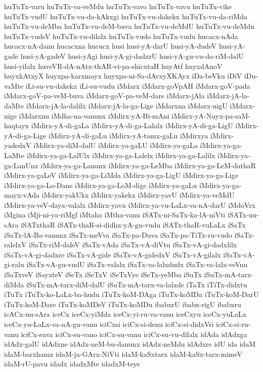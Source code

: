 {huTuTx-varu
huTuTx-va-veMdu
huTuTx-vavo
huTuTx-vavu
huTuTx-vike
huTuTx-vudU
huTuTx-vu-da-kAkxgi
huTuTx-vu-dakekx
huTuTx-vu-da-riMda
huTuTx-vu-deMba
huTuTx-vu-deM-buva
huTuTx-vu-deMdU
huTuTx-vu-deMdu
huTuTx-vudeV
huTuTx-vu-dilalx
huTuTx-vudo
huTuTx-vudu
hucacx-nAda
hucacx-nA-danu
hucacxna
hucucx
husi
husi-yA-darU
husi-yA-dudeV
husi-yA-gade
husi-yA-gadeV
husi-yAgi
husi-yA-gi-dadxrU
husi-yA-gu-vu-da-riM-dalU
husi-yilalx
huveVR-dA-nAtx-thAR-vi-pa-shicxtaH
huyAtf
huyxdAnoV
huyxkAtxyX
huyxpa-karxmayx
huyxpa-ni-Sa-dAvxyXKAyx
iDa-beVku
iDiV
iDu-vaMte
iLi-su-vu-dakekx
iLi-su-vudu
iMdarx
iMdarx-goVpAH
iMdarx-goV-pada
iMdarx-goV-pa-veM-buva
iMdarx-goV-pa-veM-dare
iMdarx-jAla
iMdarx-jA-la-daMte
iMdarx-jA-la-dalilx
iMdarx-jA-la-ga-Lige
iMdarxna
iMdarx-nigU
iMdarx-nige
iMdarxnu
iMdha-na-vanunx
iMdirx-yA-Bi-mAni
iMdirx-yA-Nuyx-pa-saM-haqtayx
iMdirx-yA-di-gaLa
iMdirx-yA-di-ga-Lalalx
iMdirx-yA-di-ga-LigU
iMdirx-yA-di-ga-Lige
iMdirx-yA-di-gaLu
iMdirx-yA-tamx-gaLu
iMdirxya
iMdirx-yadedxV
iMdirx-ya-diM-dalU
iMdirx-ya-gaLU
iMdirx-ya-gaLa
iMdirx-ya-ga-LaMte
iMdirx-ya-ga-LalUlx
iMdirx-ya-ga-Lalelx
iMdirx-ya-ga-Lalilx
iMdirx-ya-ga-LanUnx
iMdirx-ya-ga-Lanunx
iMdirx-ya-ga-LeMba
iMdirx-ya-ga-LeM-dathaR
iMdirx-ya-gaLeV
iMdirx-ya-ga-LiMda
iMdirx-ya-ga-LigU
iMdirx-ya-ga-Lige
iMdirx-ya-ga-Lo-Dane
iMdirx-ya-ga-LoM-dige
iMdirx-ya-gaLu
iMdirx-ya-ga-mayx-vAda
iMdirx-yakUkx
iMdirx-yakekx
iMdirx-yavU
iMdirx-ya-veMdU
iMdirx-ya-veV-dayx-valalx
iMdirx-yavu
iMdirx-ya-vu-LaLx-va-nA-darU
iMdoVrx
iMgina
iMji-ni-ya-riMgf
iMtaha
iMtha-vanu
iSATx-ni-SaTx-ka-lA-niVti
iSATx-nu-sAra
iSATxthaR
iSATx-thaR-si-didhx-yA-gu-vudu
iSATx-thaR-vuLaLx
iSaTx
iSaTx-lA-Ba-vanunx
iSaTx-meVva
iSaTx-pa-Duva
iSaTx-pa-TiTx-ru-vudo
iSaTx-ralelxV
iSaTx-riM-daleV
iSaTx-vAda
iSaTx-vA-diVtu
iSaTx-vA-gi-dadxlilx
iSaTx-vA-gi-dadxre
iSaTx-vA-gide
iSaTx-vA-gidedxV
iSaTx-vA-gilalx
iSaTx-vA-gi-ralu
iSaTx-vA-gu-vudU
iSaTx-valalx
iSaTx-va-lalxdudx
iSaTx-va-lalx-veVnu
iSaTxveV
iSayxteV
iSeTx
iSeTxV
iSeTxVye
iSeTx-yeMba
iSuTx
iSuTx-mA-tarx-diMda
iSuTx-mA-tarx-diM-dalU
iSuTx-mA-tarx-va-lalxde
iTaTx
iTiTx-didxtu
iTuTx
iTuTx-ko-LaLx-ba-hudu
iTuTx-koM-DAga
iTuTx-koMDa
iTuTx-koM-DarU
iTuTx-koM-Dare
iTuTx-koMDeV
iTuTx-koMDu
ibabxrU
ibabx-rigU
ibabxru
icACx-nu-sAra
iceCx
iceCx-yiMda
iceCx-yi-ru-va-vanu
iceCxyu
iceCx-yuLaLx
iceCx-yu-LaLx-va-nA-gu-vanu
iciCxsi
iciCx-si-denu
iciCx-si-didxVri
iciCx-si-ru-vanu
iciCx-suva
iciCx-su-vano
iciCx-su-vanu
iciCx-su-vu-dilalx
idAda
idAdxga
idAdx-galU
idAdxne
idAdx-neM-bu-danunx
idAdx-neMdu
idAdxre
idU
ida
idaM
idaM-barxhamx
idaM-ja-GArx-NiVti
idaM-kaSxtarx
idaM-kaSx-tarx-mimeV
idaM-rU-pavu
idadx
idadxMte
idadxM-teye
}
